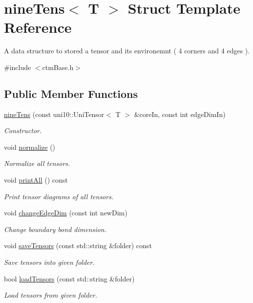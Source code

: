 \hypertarget{structnineTens}{}\section{nine\+Tens$<$ T $>$ Struct Template Reference}
\label{structnineTens}


A data structure to stored a tensor and its environemnt ( 4 corners and 4 edges ).  




{\ttfamily \#include $<$ctm\+Base.\+h$>$}

\subsection*{Public Member Functions}
\begin{DoxyCompactItemize}
\item 
\hyperlink{structnineTens_a8755d41287a4b242bd60f29668010b38}{nine\+Tens} (const uni10\+::\+Uni\+Tensor$<$ T $>$ \&core\+In, const int edge\+Dim\+In)
\begin{DoxyCompactList}\small\item\em Constructor. \end{DoxyCompactList}\item 
void \hyperlink{structnineTens_a651dd1bbbf924079a5d1f3c1d1ff4ee1}{normalize} ()
\begin{DoxyCompactList}\small\item\em Normalize all tensors. \end{DoxyCompactList}\item 
void \hyperlink{structnineTens_ae897a65e46c8353e4243672ea0db1442}{print\+All} () const \hypertarget{structnineTens_ae897a65e46c8353e4243672ea0db1442}{}\label{structnineTens_ae897a65e46c8353e4243672ea0db1442}

\begin{DoxyCompactList}\small\item\em Print tensor diagrams of all tensors. \end{DoxyCompactList}\item 
void \hyperlink{structnineTens_a6c2c802cce007a935b62ef87c9887ddb}{change\+Edge\+Dim} (const int new\+Dim)
\begin{DoxyCompactList}\small\item\em Change boundary bond dimension. \end{DoxyCompactList}\item 
void \hyperlink{structnineTens_aca2559511613f5113e5035e99658ee1d}{save\+Tensors} (const std\+::string \&folder) const 
\begin{DoxyCompactList}\small\item\em Save tensors into given folder. \end{DoxyCompactList}\item 
bool \hyperlink{structnineTens_a0c54b917445113fc20e908c73b0b8d9a}{load\+Tensors} (const std\+::string \&folder)
\begin{DoxyCompactList}\small\item\em Load tensors from given folder. \end{DoxyCompactList}\end{DoxyCompactItemize}
